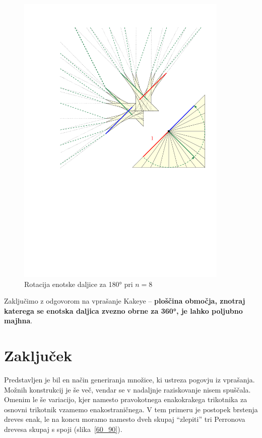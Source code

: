 \documentclass[a4paper, 12pt]{article}
\begin{document}
\begin{figure}[h!]
    \centering
    \includegraphics[width=0.9\textwidth]{ipe_slike/prehod_skupaj.pdf}
    \caption{Rotacija enotske daljice za 180° pri $ n = 8 $}
    \label{zdruzitev}
\end{figure}

Zaključimo z odgovorom na vprašanje Kakeye -- \textbf{ploščina območja, znotraj katerega se enotska daljica zvezno obrne za 360°, je lahko poljubno majhna}.

\section*{Zaključek}

Predstavljen je bil en način generiranja množice, ki ustreza pogovju iz vprašanja. Možnih konstrukcij je še več, vendar se v nadaljnje raziskovanje nisem spuščala. Omenim le še variacijo, kjer namesto pravokotnega enakokrakega trikotnika za osnovni trikotnik vzamemo enakostraničnega. V tem primeru je postopek brstenja dreves enak, le na koncu moramo namesto dveh skupaj ``zlepiti'' tri Perronova drevesa skupaj s spoji (slika~\ref{60_90}).
\end{document}
